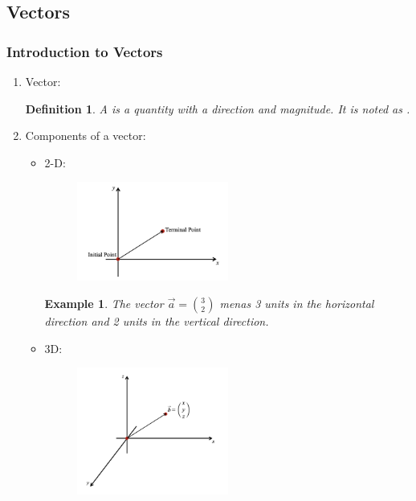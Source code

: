 \documentclass[12pt, a4paper]{article}
\newtheorem{definition}{Definition}[subsection]
\newtheorem{example}{Example}[subsection]
\begin{document}
\subsection{Vectors}
\subsubsection{Introduction to Vectors}
\begin{enumerate}
  \item Vector: 
  \begin{definition}
    A \textbf{\color{red}{vector}} is a quantity with a direction and magnitude. It is noted as {}.
  \end{definition}
  \item Components of a vector: 
  \begin{itemize}
    \item 2-D: 
    \begin{figure}[H]
      \centering
      \includegraphics[width=0.5\textwidth]{Fig.3.1.jpg}
    \end{figure}
    \begin{example}
      The vector $\vec{a}=\binom{3}{2}$ menas 3 units in the horizontal direction and 2 units in the vertical direction.
    \end{example}
    \item 3D: 
    \begin{figure}[H]
      \centering
      \includegraphics[width=0.5\textwidth]{Fig.3.2.jpg}
    \end{figure}

\end{itemize}
\end{enumerate}
\end{document}

